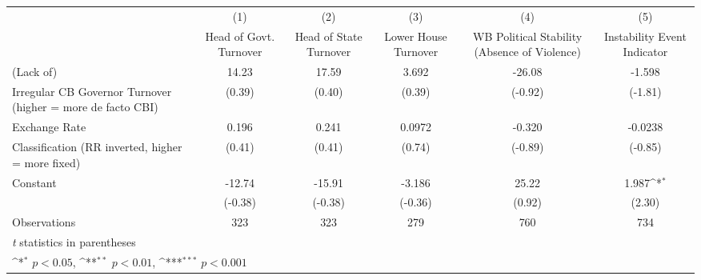 {
\def\sym#1{\ifmmode^{#1}\else\(^{#1}\)\fi}
\begin{tabular}{l*{5}{c}}
\toprule
                &\multicolumn{1}{c}{(1)}&\multicolumn{1}{c}{(2)}&\multicolumn{1}{c}{(3)}&\multicolumn{1}{c}{(4)}&\multicolumn{1}{c}{(5)}\\
                &\multicolumn{1}{c}{Head of Govt. Turnover}&\multicolumn{1}{c}{Head of State Turnover}&\multicolumn{1}{c}{Lower House Turnover}&\multicolumn{1}{c}{WB Political Stability (Absence of Violence)}&\multicolumn{1}{c}{Instability Event Indicator}\\
\midrule
(Lack of)       &    14.23         &    17.59         &    3.692         &   -26.08         &   -1.598         \\
Irregular CB Governor Turnover (higher = more de facto CBI)&   (0.39)         &   (0.40)         &   (0.39)         &  (-0.92)         &  (-1.81)         \\
\addlinespace
Exchange Rate   &    0.196         &    0.241         &   0.0972         &   -0.320         &  -0.0238         \\
Classification (RR inverted, higher = more fixed)&   (0.41)         &   (0.41)         &   (0.74)         &  (-0.89)         &  (-0.85)         \\
\addlinespace
Constant        &   -12.74         &   -15.91         &   -3.186         &    25.22         &    1.987\sym{*}  \\
                &  (-0.38)         &  (-0.38)         &  (-0.36)         &   (0.92)         &   (2.30)         \\
\midrule
Observations    &      323         &      323         &      279         &      760         &      734         \\
\bottomrule
\multicolumn{6}{l}{\footnotesize \textit{t} statistics in parentheses}\\
\multicolumn{6}{l}{\footnotesize \sym{*} \(p<0.05\), \sym{**} \(p<0.01\), \sym{***} \(p<0.001\)}\\
\end{tabular}
}
